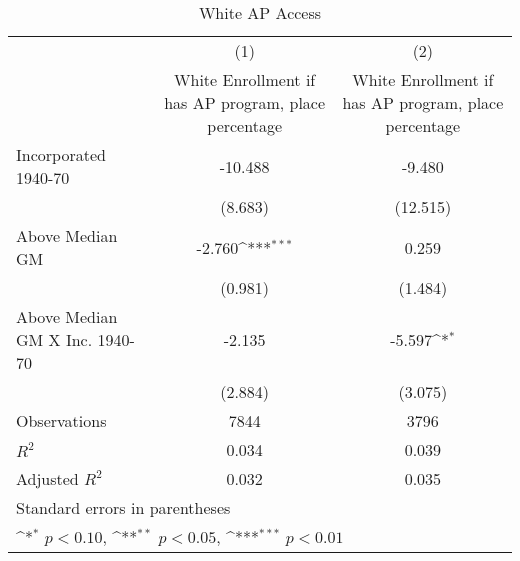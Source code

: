 \begin{table}[htbp]\centering
\def\sym#1{\ifmmode^{#1}\else\(^{#1}\)\fi}
\caption{White AP Access}
\begin{tabular}{l*{2}{c}}
\hline\hline
                    &\multicolumn{1}{c}{(1)}&\multicolumn{1}{c}{(2)}\\
                    &\multicolumn{1}{c}{White Enrollment if has AP program, place percentage}&\multicolumn{1}{c}{White Enrollment if has AP program, place percentage}\\
\hline
Incorporated 1940-70&     -10.488         &      -9.480         \\
                    &     (8.683)         &    (12.515)         \\
[1em]
Above Median GM     &      -2.760\sym{***}&       0.259         \\
                    &     (0.981)         &     (1.484)         \\
[1em]
Above Median GM X Inc. 1940-70&      -2.135         &      -5.597\sym{*}  \\
                    &     (2.884)         &     (3.075)         \\
\hline
Observations        &        7844         &        3796         \\
\(R^{2}\)           &       0.034         &       0.039         \\
Adjusted \(R^{2}\)  &       0.032         &       0.035         \\
\hline\hline
\multicolumn{3}{l}{\footnotesize Standard errors in parentheses}\\
\multicolumn{3}{l}{\footnotesize \sym{*} \(p<0.10\), \sym{**} \(p<0.05\), \sym{***} \(p<0.01\)}\\
\end{tabular}
\end{table}
